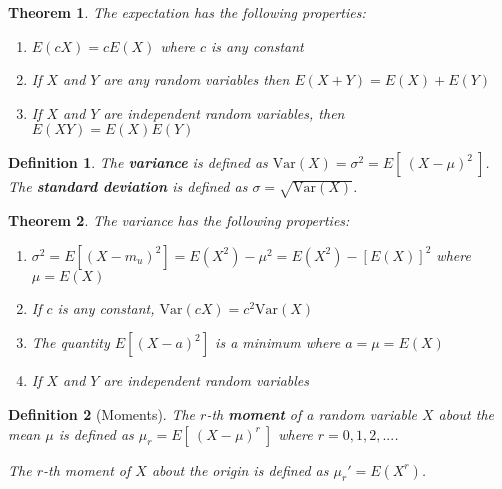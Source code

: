 \documentclass[12pt,twoside]{report}
\newtheorem{defn}{Definition}
\newtheorem{thm}{Theorem}
\begin{document}
\begin{samepage}
\begin{thm}  
    The expectation has the following properties:

    \begin{enumerate}
        \item $E(c X) = c E(X)$ where $c$ is any constant
        \item If $X$ and $Y$ are any random variables then $E(X + Y) = E(X) + E(Y)$
        \item If $X$ and $Y$ are independent random variables, then $E(XY) = E(X)E(Y)$
    \end{enumerate}
\end{thm}
\end{samepage}

\begin{defn}
    The \textbf{variance} is defined as $\text{Var} (X) = \sigma ^2 = E[ \  (X - \mu)^2 \  ]$.
    The \textbf{standard deviation} is defined as $\sigma = \sqrt{\text{Var} (X)}$.
\end{defn}

\begin{samepage}
\begin{thm}
    The variance has the following properties:

    \begin{enumerate}
        \item $\sigma ^2 = E\left [ \left (X - m_u\right ) ^2 \right ] = E\left (X ^2\right ) - \mu ^2 = E\left (X ^2\right ) - \left [E\left (X\right )\right ] ^2$ where $\mu = E\left (X\right )$
        \item If $c$ is any constant, $\text{Var}(cX) = c^2 \text{Var}(X)$
        \item The quantity $E[ (X - a)^2 ]$ is a minimum where $a = \mu = E(X)$
        \item If $X$ and $Y$ are independent random variables
    \end{enumerate}
\end{thm}
\end{samepage}

\begin{defn}[Moments]
    The $r$-th \textbf{moment} of a random variable $X$ about the mean $\mu$ is defined as $\mu_r = E[\  (X - \mu)^r \ ]$ where $r=0, 1, 2, ...$. 

    The $r$-th moment of $X$ about the origin is defined as $\mu_r ' = E(X^r)$.
\end{defn}
\end{document}
